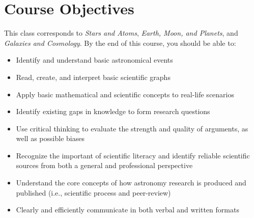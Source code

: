 \documentclass[11pt]{article}
\begin{document}
\section*{Course Objectives}
This class corresponds to \textit{Stars and Atoms}, \textit{Earth, Moon, and Planets}, and \textit{Galaxies and Cosmology}.  By the end of this course, you should be able to:
\begin{itemize}
    \item Identify and understand basic astronomical events
    \item Read, create, and interpret basic scientific graphs
     \item Apply basic mathematical and scientific concepts to real-life scenarios
    \item Identify existing gaps in knowledge to form research questions
    \item Use critical thinking to evaluate the strength and quality of arguments, as well as possible biases
    \item Recognize the important of scientific literacy and identify reliable scientific sources from both a general and professional perspective
    \item Understand the core concepts of how astronomy research is produced and published (i.e., scientific process and peer-review) %
    \item Clearly and efficiently communicate in both verbal and written formats
\end{itemize}
 
\end{document}
